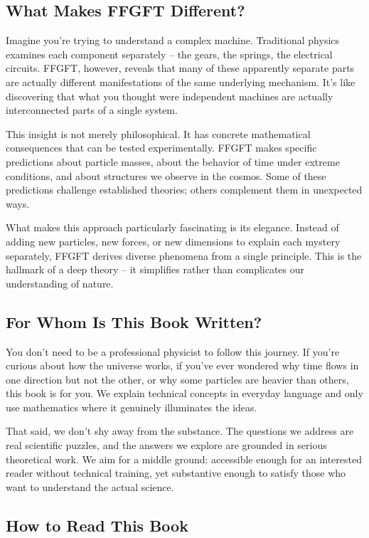 \documentclass[11pt,oneside]{book}
\begin{document}
	\subsection*{What Makes FFGFT Different?}
	
	Imagine you're trying to understand a complex machine. Traditional physics examines each component separately – the gears, the springs, the electrical circuits. FFGFT, however, reveals that many of these apparently separate parts are actually different manifestations of the same underlying mechanism. It's like discovering that what you thought were independent machines are actually interconnected parts of a single system.
	
	This insight is not merely philosophical. It has concrete mathematical consequences that can be tested experimentally. FFGFT makes specific predictions about particle masses, about the behavior of time under extreme conditions, and about structures we observe in the cosmos. Some of these predictions challenge established theories; others complement them in unexpected ways.
	
	What makes this approach particularly fascinating is its elegance. Instead of adding new particles, new forces, or new dimensions to explain each mystery separately, FFGFT derives diverse phenomena from a single principle. This is the hallmark of a deep theory – it simplifies rather than complicates our understanding of nature.
	
	\subsection*{For Whom Is This Book Written?}
	
	You don't need to be a professional physicist to follow this journey. If you're curious about how the universe works, if you've ever wondered why time flows in one direction but not the other, or why some particles are heavier than others, this book is for you. We explain technical concepts in everyday language and only use mathematics where it genuinely illuminates the ideas.
	
	That said, we don't shy away from the substance. The questions we address are real scientific puzzles, and the answers we explore are grounded in serious theoretical work. We aim for a middle ground: accessible enough for an interested reader without technical training, yet substantive enough to satisfy those who want to understand the actual science.
	
	\subsection*{How to Read This Book}
	
\end{document}
